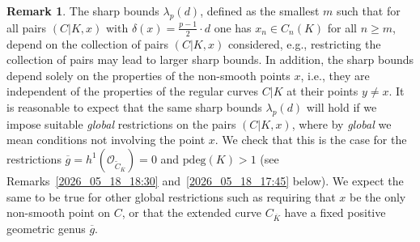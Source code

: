 \documentclass[12pt,reqno]{amsart}%
\theoremstyle{definition}
\newtheorem{rem}[prop]{Remark}
\theoremstyle{remark}
\newcommand{\ov}{\overline}
\newcommand{\OO}{\mathcal{O}}
\newcommand{\de}{\delta}
\newcommand{\lam}{\lambda}
\begin{document}
\begin{rem}
The sharp bounds $\lam_p(d)$, defined as the smallest $m$ such that for all pairs $(C|K,x)$ with $\de(x) = \frac{p-1}2{\cdot}d$ one has $x_n \in C_n(K)$ for all $n\geq m$, depend on the collection of pairs $(C|K,x)$ considered, 
e.g., restricting the collection of pairs may lead to larger sharp bounds.
In addition, the sharp bounds depend solely on the properties of the non-smooth points $x$, i.e., they are independent of the properties of the regular curves $C|K$ at their points $y \neq x$.
It is reasonable to expect that the same sharp bounds $\lam_p(d)$ will hold if we impose suitable \emph{global} restrictions on the pairs $(C|K,x)$, where by \emph{global} we mean conditions not involving the point $x$. We check that this is the case for the restrictions $\ov g = h^1(\OO_{\tilde C_{\ov K}}) = 0$ and $\mathrm{pdeg}(K)>1$ (see Remarks~\ref{2026_05_18_18:30} and~\ref{2026_05_18_17:45} below). We expect the same to be true for other global restrictions such as requiring that $x$ be the only non-smooth point on $C$, or that the extended curve $C_{\ov K}$ have a fixed positive geometric genus $\ov g$.




\end{rem}
\end{document}

